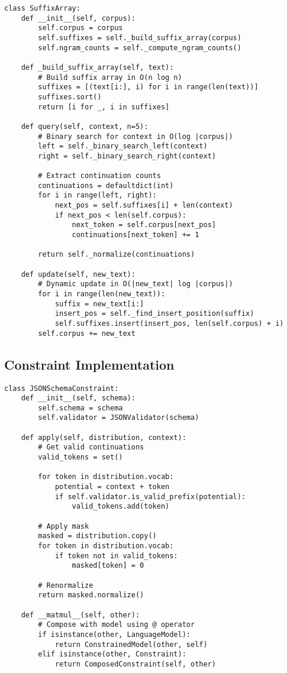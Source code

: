 \documentclass{article}
\theoremstyle{definition}
\begin{document}
\begin{lstlisting}
class SuffixArray:
    def __init__(self, corpus):
        self.corpus = corpus
        self.suffixes = self._build_suffix_array(corpus)
        self.ngram_counts = self._compute_ngram_counts()

    def _build_suffix_array(self, text):
        # Build suffix array in O(n log n)
        suffixes = [(text[i:], i) for i in range(len(text))]
        suffixes.sort()
        return [i for _, i in suffixes]

    def query(self, context, n=5):
        # Binary search for context in O(log |corpus|)
        left = self._binary_search_left(context)
        right = self._binary_search_right(context)

        # Extract continuation counts
        continuations = defaultdict(int)
        for i in range(left, right):
            next_pos = self.suffixes[i] + len(context)
            if next_pos < len(self.corpus):
                next_token = self.corpus[next_pos]
                continuations[next_token] += 1

        return self._normalize(continuations)

    def update(self, new_text):
        # Dynamic update in O(|new_text| log |corpus|)
        for i in range(len(new_text)):
            suffix = new_text[i:]
            insert_pos = self._find_insert_position(suffix)
            self.suffixes.insert(insert_pos, len(self.corpus) + i)
        self.corpus += new_text
\end{lstlisting}

\subsection{Constraint Implementation}

\begin{lstlisting}
class JSONSchemaConstraint:
    def __init__(self, schema):
        self.schema = schema
        self.validator = JSONValidator(schema)

    def apply(self, distribution, context):
        # Get valid continuations
        valid_tokens = set()

        for token in distribution.vocab:
            potential = context + token
            if self.validator.is_valid_prefix(potential):
                valid_tokens.add(token)

        # Apply mask
        masked = distribution.copy()
        for token in distribution.vocab:
            if token not in valid_tokens:
                masked[token] = 0

        # Renormalize
        return masked.normalize()

    def __matmul__(self, other):
        # Compose with model using @ operator
        if isinstance(other, LanguageModel):
            return ConstrainedModel(other, self)
        elif isinstance(other, Constraint):
            return ComposedConstraint(self, other)
\end{lstlisting}
\end{document}
